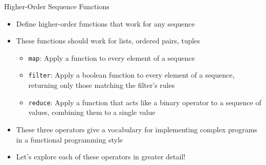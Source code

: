 \documentclass[14pt,aspectratio=169]{beamer}
\begin{document}
%
\begin{frame}{Higher-Order Sequence Functions}
  \begin{itemize}
    \item Define higher-order functions that work for any sequence
      \vspace*{-.15in}
    \item These functions should work for lists, ordered pairs, tuples
      \begin{itemize}
        \item {\tt map}: Apply a function to every element of a sequence
        \item {\tt filter}: Apply a boolean function to every element of a
          sequence, returning only those matching the filter's rules
        \item {\tt reduce}: Apply a function that acts like a binary operator to
          a sequence of values, combining them to a single value
      \end{itemize}
      \vspace*{-.2in}
    \item These three operators give a vocabulary for implementing complex
      programs in a functional programming style
      \vspace*{-.2in}
    \item Let's explore each of these operators in greater detail!
  \end{itemize}
\end{frame}
\end{document}
